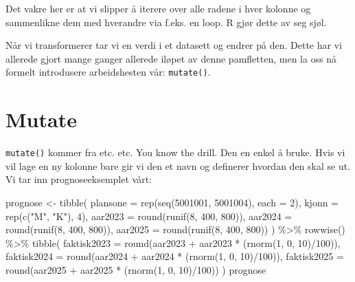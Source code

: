 \documentclass[
  letterpaper,
  DIV=11,
  numbers=noendperiod]{scrreprt}
\newenvironment{Shaded}{\begin{snugshade}}{\end{snugshade}}
\newcommand{\AttributeTok}[1]{\textcolor[rgb]{0.40,0.45,0.13}{#1}}
\newcommand{\DecValTok}[1]{\textcolor[rgb]{0.68,0.00,0.00}{#1}}
\newcommand{\FunctionTok}[1]{\textcolor[rgb]{0.28,0.35,0.67}{#1}}
\newcommand{\NormalTok}[1]{\textcolor[rgb]{0.00,0.23,0.31}{#1}}
\newcommand{\OtherTok}[1]{\textcolor[rgb]{0.00,0.23,0.31}{#1}}
\newcommand{\SpecialCharTok}[1]{\textcolor[rgb]{0.37,0.37,0.37}{#1}}
\newcommand{\StringTok}[1]{\textcolor[rgb]{0.13,0.47,0.30}{#1}}
\begin{document}
Det vakre her er at vi slipper å iterere over alle radene i hver kolonne
og sammenlikne dem med hverandre via f.eks. en loop. R gjør dette av seg
sjøl.

Når vi transformerer tar vi en verdi i et datasett og endrer på den.
Dette har vi allerede gjort mange ganger allerede iløpet av denne
pamfletten, men la oss nå formelt introdusere arbeidshesten vår:
\texttt{mutate()}.

\hypertarget{mutate}{%
\section{Mutate}\label{mutate}}

\texttt{mutate()} kommer fra etc. etc. You know the drill. Den en enkel
å bruke. Hvis vi vil lage en ny kolonne bare gir vi den et navn og
definerer hvordan den skal se ut. Vi tar inn prognoseeksemplet vårt:

\begin{Shaded}
\begin{Highlighting}[]
\NormalTok{prognose }\OtherTok{\textless{}{-}} \FunctionTok{tibble}\NormalTok{(}
  \AttributeTok{plansone =} \FunctionTok{rep}\NormalTok{(}\FunctionTok{seq}\NormalTok{(}\DecValTok{5001001}\NormalTok{, }\DecValTok{5001004}\NormalTok{), }\AttributeTok{each =} \DecValTok{2}\NormalTok{),}
  \AttributeTok{kjonn =} \FunctionTok{rep}\NormalTok{(}\FunctionTok{c}\NormalTok{(}\StringTok{"M"}\NormalTok{, }\StringTok{"K"}\NormalTok{), }\DecValTok{4}\NormalTok{),}
  \AttributeTok{aar2023 =} \FunctionTok{round}\NormalTok{(}\FunctionTok{runif}\NormalTok{(}\DecValTok{8}\NormalTok{, }\DecValTok{400}\NormalTok{, }\DecValTok{800}\NormalTok{)),}
  \AttributeTok{aar2024 =} \FunctionTok{round}\NormalTok{(}\FunctionTok{runif}\NormalTok{(}\DecValTok{8}\NormalTok{, }\DecValTok{400}\NormalTok{, }\DecValTok{800}\NormalTok{)),}
  \AttributeTok{aar2025 =} \FunctionTok{round}\NormalTok{(}\FunctionTok{runif}\NormalTok{(}\DecValTok{8}\NormalTok{, }\DecValTok{400}\NormalTok{, }\DecValTok{800}\NormalTok{))}
\NormalTok{) }\SpecialCharTok{\%\textgreater{}\%} 
  \FunctionTok{rowwise}\NormalTok{() }\SpecialCharTok{\%\textgreater{}\%} 
  \FunctionTok{tibble}\NormalTok{(}
    \AttributeTok{faktisk2023 =} \FunctionTok{round}\NormalTok{(aar2023 }\SpecialCharTok{+}\NormalTok{ aar2023 }\SpecialCharTok{*}\NormalTok{ (}\FunctionTok{rnorm}\NormalTok{(}\DecValTok{1}\NormalTok{, }\DecValTok{0}\NormalTok{, }\DecValTok{10}\NormalTok{)}\SpecialCharTok{/}\DecValTok{100}\NormalTok{)),}
    \AttributeTok{faktisk2024 =} \FunctionTok{round}\NormalTok{(aar2024 }\SpecialCharTok{+}\NormalTok{ aar2024 }\SpecialCharTok{*}\NormalTok{ (}\FunctionTok{rnorm}\NormalTok{(}\DecValTok{1}\NormalTok{, }\DecValTok{0}\NormalTok{, }\DecValTok{10}\NormalTok{)}\SpecialCharTok{/}\DecValTok{100}\NormalTok{)),}
    \AttributeTok{faktisk2025 =} \FunctionTok{round}\NormalTok{(aar2025 }\SpecialCharTok{+}\NormalTok{ aar2025 }\SpecialCharTok{*}\NormalTok{ (}\FunctionTok{rnorm}\NormalTok{(}\DecValTok{1}\NormalTok{, }\DecValTok{0}\NormalTok{, }\DecValTok{10}\NormalTok{)}\SpecialCharTok{/}\DecValTok{100}\NormalTok{))}
\NormalTok{  )}
\NormalTok{prognose}
\end{Highlighting}
\end{Shaded}
\end{document}
